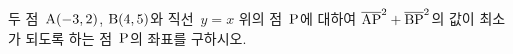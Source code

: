 두 점~$\mathrm{A}(-3{,}\mkern3mu\mathopen{}2)$, $\mathrm{B}(4{,}\mkern3mu\mathopen{}5)$와 직선~$y=x$ 위의 점~$\mathrm{P}$에 대하여 $\overline{\mathrm{AP}}^2+\overline{\mathrm{BP}}^2$의 값이 최소가 되도록 하는 점~$\mathrm{P}$의 좌표를 구하시오.
